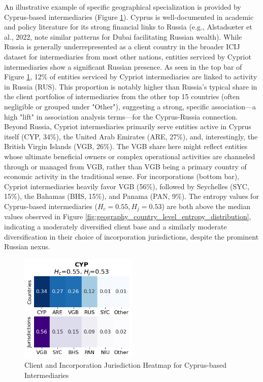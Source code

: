 An illustrative example of specific geographical specialization is provided by Cyprus-based intermediaries (Figure \ref{fig:geography_country_heatmaps_cyprus}). Cyprus is well-documented in academic and policy literature for its strong financial links to Russia (e.g., Alstadsæter et al., 2022, note similar patterns for Dubai facilitating Russian wealth). While Russia is generally underrepresented as a client country in the broader ICIJ dataset for intermediaries from most other nations, entities serviced by Cypriot intermediaries show a significant Russian presence. As seen in the top bar of Figure \ref{fig:geography_country_heatmaps_cyprus}, 12\% of entities serviced by Cypriot intermediaries are linked to activity in Russia (RUS). This proportion is notably higher than Russia's typical share in the client portfolios of intermediaries from the other top 15 countries (often negligible or grouped under "Other"), suggesting a strong, specific association—a high "lift" in association analysis terms—for the Cyprus-Russia connection. Beyond Russia, Cypriot intermediaries primarily serve entities active in Cyprus itself (CYP, 34\%), the United Arab Emirates (ARE, 27\%), and, interestingly, the British Virgin Islands (VGB, 26\%). The VGB share here might reflect entities whose ultimate beneficial owners or complex operational activities are channeled through or managed from VGB, rather than VGB being a primary country of economic activity in the traditional sense. For incorporations (bottom bar), Cypriot intermediaries heavily favor VGB (56\%), followed by Seychelles (SYC, 15\%), the Bahamas (BHS, 15\%), and Panama (PAN, 9\%). The entropy values for Cyprus-based intermediaries ($H_c = 0.55, H_j = 0.53$) are both above the median values observed in Figure \ref{fig:geography_country_level_entropy_distribution}, indicating a moderately diversified client base and a similarly moderate diversification in their choice of incorporation jurisdictions, despite the prominent Russian nexus.

\begin{figure}[htbp]
    \centering
    \includegraphics[width=0.5\textwidth]{images/Geography_Country_Heatmaps_Cyprus.png} %
    \caption{Client and Incorporation Jurisdiction Heatmap for Cyprus-based Intermediaries}
    \label{fig:geography_country_heatmaps_cyprus}
\end{figure}

